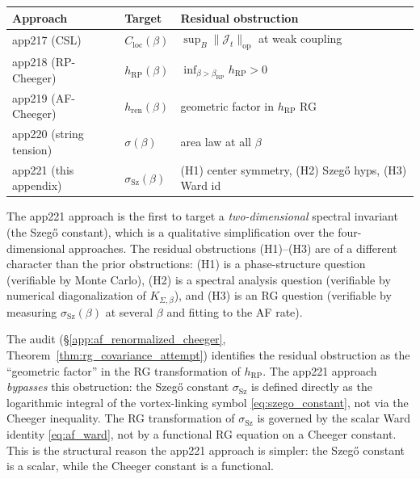 \begin{remark}
\label{rem:cv_comparison}
\begin{center}
\begin{tabular}{lll}
\hline
Approach & Target & Residual obstruction \\
\hline
app217 (CSL) & $C_{\mathrm{loc}}(\beta)$ & $\sup_{B}\|\mathcal{J}_{t}\|_{\mathrm{op}}$ at weak coupling \\
app218 (RP-Cheeger) & $h_{\mathrm{RP}}(\beta)$ & $\inf_{\beta>\beta_{\mathrm{RP}}}h_{\mathrm{RP}}>0$ \\
app219 (AF-Cheeger) & $h_{\mathrm{ren}}(\beta)$ & geometric factor in $h_{\mathrm{RP}}$ RG \\
app220 (string tension) & $\sigma(\beta)$ & area law at all $\beta$ \\
app221 (this appendix) & $\sigma_{\mathrm{Sz}}(\beta)$ & (H1) center symmetry, (H2) Szeg\H{o} hyps, (H3) Ward id \\
\hline
\end{tabular}
\end{center}
The app221 approach is the first to target a \emph{two-dimensional}
spectral invariant (the Szeg\H{o} constant), which is a qualitative
simplification over the four-dimensional approaches. The residual
obstructions (H1)--(H3) are of a different character than the prior
obstructions: (H1) is a phase-structure question (verifiable by
Monte Carlo), (H2) is a spectral analysis question (verifiable by
numerical diagonalization of $K_{\Sigma,\beta}$), and (H3) is an
RG question (verifiable by measuring $\sigma_{\mathrm{Sz}}(\beta)$
at several $\beta$ and fitting to the AF rate).
\end{remark}

\begin{remark}
\label{rem:cv_geometric_factor}
The audit (\S\ref{app:af_renormalized_cheeger},
Theorem~\ref{thm:rg_covariance_attempt}) identifies the residual
obstruction as the ``geometric factor'' in the RG transformation of
$h_{\mathrm{RP}}$. The app221 approach \emph{bypasses} this
obstruction: the Szeg\H{o} constant $\sigma_{\mathrm{Sz}}$ is
defined directly as the logarithmic integral of the vortex-linking
symbol \eqref{eq:szego_constant}, not via the Cheeger inequality.
The RG transformation of $\sigma_{\mathrm{Sz}}$ is governed by the
scalar Ward identity \eqref{eq:af_ward}, not by a functional RG
equation on a Cheeger constant. This is the structural reason the
app221 approach is simpler: the Szeg\H{o} constant is a scalar,
while the Cheeger constant is a functional.
\end{remark}

